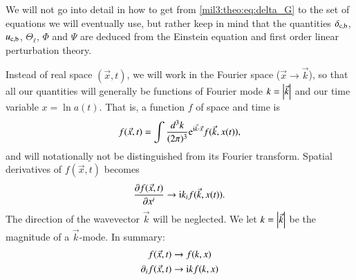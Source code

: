 We will not go into detail in how to get from \cref{mil3:theo:eq:delta_G} to the set of equations we will eventually use, but rather keep in mind that the quantities $\delta_\mathrm{c,b}$, $u_\mathrm{c,b}$, $\Theta_\ell$, $\Phi$ and $\Psi$ are deduced from the Einstein equation and first order linear perturbation theory. 


Instead of real space $(\vec{x}, t)$, we will work in the Fourier space ($\vec{x}\to\vec{k}$), so that all our quantities will generally be functions of Fourier mode $k=\abs{\vec{k}}$ and our time variable $x = \ln{a(t)}$. That is, a function $f$ of space and time is
\begin{equation}
    f(\vec{x}, t) = \int \frac{d^3 k}{(2\pi)^3} \eu^{\im \vec{k}\cdot \vec{x}}f(\vec{k}, x(t)),
\end{equation}
and will notationally not be distinguished from its Fourier transform. Spatial derivatives of $f(\vec{x}, t)$ becomes
\begin{equation}
    \pdv{f(\vec{x}, t)}{x^i} \to \mathrm{i} k_i f(\vec{k}, x(t)).
\end{equation}
The direction of the wavevector $\vec{k}$ will be neglected. We let $k=\abs{\vec{k}}$ be the magnitude of a $\vec{k}$-mode. In summary:
\begin{equation}
\begin{split}
    f(\vec{x}, t) &\to f(k, x) \\
    \partial_i f(\vec{x}, t) &\to \mathrm{i} k f(k, x)
\end{split}
\end{equation}


